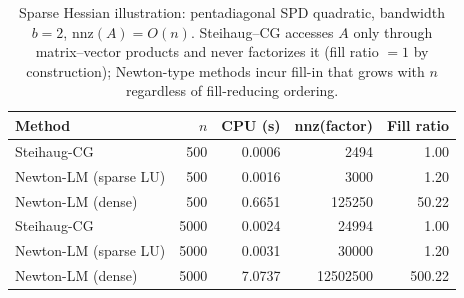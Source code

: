 \begin{table}[ht]
\centering
\small
\begin{tabular}{l r r r r}
\toprule
Method & $n$ & CPU (s) & nnz(factor) & Fill ratio \\
\midrule
  Steihaug-CG & 500 & 0.0006 & 2494 & 1.00 \\
  Newton-LM (sparse LU) & 500 & 0.0016 & 3000 & 1.20 \\
  Newton-LM (dense) & 500 & 0.6651 & 125250 & 50.22 \\
\addlinespace
  Steihaug-CG & 5000 & 0.0024 & 24994 & 1.00 \\
  Newton-LM (sparse LU) & 5000 & 0.0031 & 30000 & 1.20 \\
  Newton-LM (dense) & 5000 & 7.0737 & 12502500 & 500.22 \\
\bottomrule
\end{tabular}
\caption{Sparse Hessian illustration: pentadiagonal SPD quadratic, bandwidth $b=2$, $\mathrm{nnz}(A) = O(n)$. Steihaug--CG accesses $A$ only through matrix--vector products and never factorizes it (fill ratio $=1$ by construction); Newton-type methods incur fill-in that grows with $n$ regardless of fill-reducing ordering.}
\label{tab:sparse}
\end{table}
